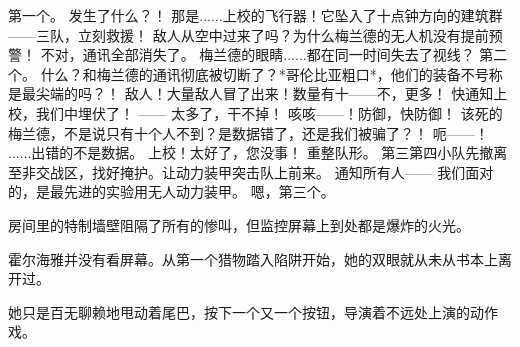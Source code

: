 \documentclass[openany]{book}
\begin{document}
\begin{dialogue}
     第一个。
     发生了什么？！
     那是......上校的飞行器！它坠入了十点钟方向的建筑群——三队，立刻救援！
     敌人从空中过来了吗？为什么梅兰德的无人机没有提前预警！
     不对，通讯全部消失了。
     梅兰德的眼睛......都在同一时间失去了视线？
     第二个。
     什么？和梅兰德的通讯彻底被切断了？*哥伦比亚粗口*，他们的装备不号称是最尖端的吗？！
     敌人！大量敌人冒了出来！数量有十——不，更多！
     快通知上校，我们中埋伏了！
     ——
     太多了，干不掉！
     咳咳——！防御，快防御！
     该死的梅兰德，不是说只有十个人不到？是数据错了，还是我们被骗了？！
     呃——！
     ......出错的不是数据。
     上校！太好了，您没事！
     重整队形。
     第三第四小队先撤离至非交战区，找好掩护。让动力装甲突击队上前来。
     通知所有人——
     我们面对的，是最先进的实验用无人动力装甲。
     嗯，第三个。
\end{dialogue}

\par
房间里的特制墙壁阻隔了所有的惨叫，但监控屏幕上到处都是爆炸的火光。\par
霍尔海雅并没有看屏幕。从第一个猎物踏入陷阱开始，她的双眼就从未从书本上离开过。\par
她只是百无聊赖地甩动着尾巴，按下一个又一个按钮，导演着不远处上演的动作戏。
\end{document}
